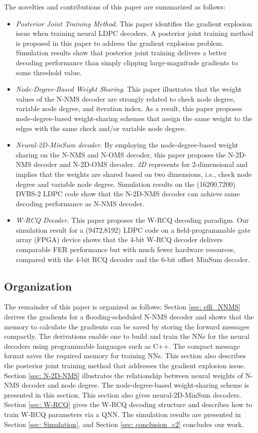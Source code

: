\documentclass [PhD] {uclathes}
\begin{document}
The novelties and contributions of this paper are summarized as follows:  
\begin{itemize}
    \item \textit{Posterior Joint Training Method.} This paper identifies the gradient explosion issue when training neural LDPC decoders. A posterior joint training method is proposed in this paper to address the gradient explosion problem. Simulation results show that posterior joint training delivers a better decoding performance than simply clipping large-magnitude gradients to some threshold value.
     \item \textit{Node-Degree-Based Weight Sharing}. 
     This paper illustrates that the weight values of the N-NMS decoder are strongly related to check node degree, variable node degree, and iteration index. As a result, this paper proposes node-degree-based weight-sharing schemes that assign the same weight to the edges with the same check and/or variable node degree.
     \item \textit{Neural-2D-MinSum decoder}. By employing the node-degree-based weight sharing  on the N-NMS and N-OMS decoder, this paper proposes the N-2D-NMS decoder and N-2D-OMS decoder. \emph{2D} represents for 2-dimensional and implies that the weights are shared based on two dimensions, i.e., check node degree and variable node degree.
     Simulation results on the (16200,7200) DVBS-2 LDPC code show that the N-2D-NMS decoder can achieve same decoding performance as N-NMS decoder. 
    \item  \textit{W-RCQ Decoder.} This paper proposes the W-RCQ decoding paradigm.  Our simulation result for a (9472,8192) LDPC code on a field-programmable gate array (FPGA) device shows that the 4-bit W-RCQ decoder delivers comparable FER performance but with much fewer hardware resources, compared with the 4-bit RCQ decoder and the 6-bit offset MinSum decoder.
\end{itemize}

\subsection{Organization}

The remainder of this paper is organized as follows: Section \ref{sec: effi_NNMS} derives the gradients for a flooding-scheduled N-NMS decoder and shows that the memory to calculate the gradients can be saved by storing the forward messages compactly. The derivations enable one to build and train the NNs for the neural decoders using programmable languages such as C++. The compact message format saves the required memory for training NNs. This section also describes the posterior joint training method that addresses the gradient explosion issue. Section \ref{sec: N-2D-NMS} illustrates the relationship between neural weights of N-NMS decoder and node degree. The node-degree-based weight-sharing scheme is presented in this section. This section also gives neural-2D-MinSum decoders. Section \ref{sec: W-RCQ} gives the W-RCQ decoding structure and describes how to train W-RCQ  parameters via a QNN. The simulation results are presented in Section \ref{sec: Simulation}, and Section \ref{sec: conclusion_c2} concludes our work. 
\end{document}
